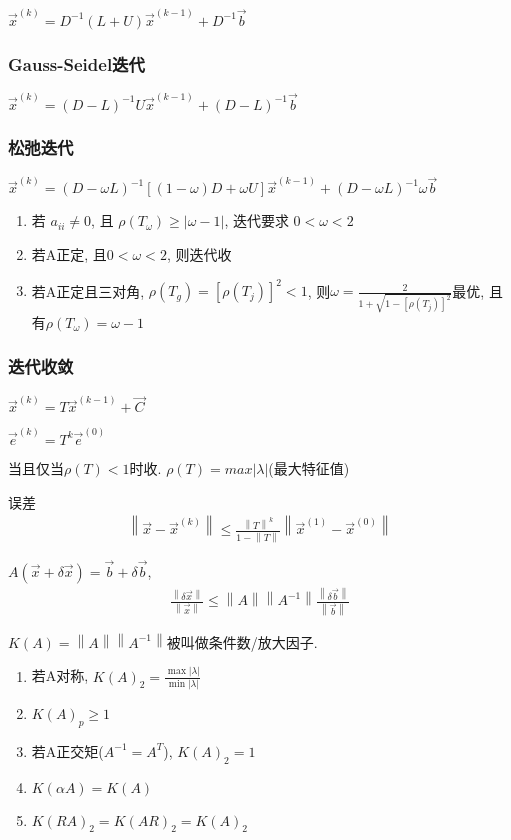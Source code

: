 \documentclass{source/Paper}
\begin{document}
    $\vec{x}^{(k)}=D^{-1}(L+U)\vec{x}^{(k-1)}+D^{-1}\vec{b}$

    \subsubsection{Gauss-Seidel迭代}
    $\vec{x}^{(k)}=(D-L)^{-1}U\vec{x}^{(k-1)}+(D-L)^{-1}\vec{b}$


    \subsubsection{松弛迭代}

    $\vec{x}^{(k)}=(D-\omega L)^{-1}[(1-\omega)D+\omega U]\vec{x}^{(k-1)}+(D-\omega L)^{-1}\omega\vec{b}$

    \begin{enumerate}
        \item 若 $a_{ii}\ne 0$, 且 $\rho(T_{\omega})\ge |\omega-1|$, 迭代要求 $0<\omega<2$
        \item 若A正定, 且$0<\omega<2$, 则迭代收
        \item 若A正定且三对角, $\rho(T_g)=[\rho(T_j)]^2<1$, 则$\omega=\frac{2}{1+\sqrt{1-[\rho(T_j)]^2}}$最优, 且有$\rho(T_{\omega})=\omega-1$
    \end{enumerate}

    \subsubsection{迭代收敛}
    $\vec{x}^{(k)}=T\vec{x}^{(k-1)}+\vec{C}$

    $\vec{e}^{(k)}=T^k\vec{e}^{(0)}$

    当且仅当$\rho(T)<1$时收. $\rho(T)=max|\lambda|$(最大特征值)

    误差
    \begin{align*}
        \left\| \vec{x}-\vec{x}^{(k)} \right\|\le \frac{\left\| T \right\|^k}{1-\left\| T \right\|}\left\| \vec{x}^{(1)}-\vec{x}^{(0)} \right\|
    \end{align*}

    $A(\vec{x}+\delta\vec{x})=\vec{b}+\delta\vec{b}$, 
    \begin{align*}
        \frac{\left\| \delta\vec{x} \right\|}{\left\| \vec{x} \right\|}\le \left\| A \right\|\left\| A^{-1} \right\|\frac{\left\| \delta\vec{b} \right\|}{\left\| \vec{b} \right\|}
    \end{align*}

    $K(A)=\left\| A \right\|\left\| A^{-1} \right\|$被叫做条件数/放大因子. 
    \begin{enumerate}
        \item 若A对称, $K(A)_2=\frac{\max |\lambda|}{\min |\lambda|}$
        \item $K(A)_p\ge1$
        \item 若A正交矩($A^{-1}=A^T$), $K(A)_2=1$
        \item $K(\alpha A)=K(A)$
        \item $K(RA)_2=K(AR)_2=K(A)_2$
    \end{enumerate}
\end{document}
